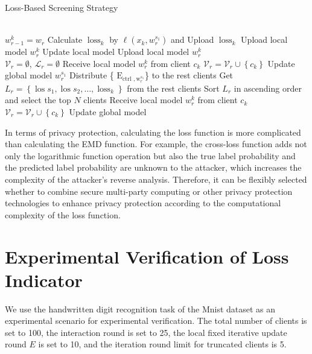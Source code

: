 \documentclass{article}
\begin{document}
\begin{algorithm}[!htbp] 
\caption{Loss-Based Screening Strategy} 
\begin{algorithmic}[1] %
\REQUIRE ~~\\ %
\STATE $w_{r-1}^{k}=w_{r}$
\STATE Calculate $\operatorname{loss}_{k}$ by $\ell\left(x_{k}, w_{r}^{s_{1}}\right)$ and Upload  $\operatorname{loss}_{k}$
\STATE Upload local model $w_{r}^{k}$
\RETURN
\ENDIF
\ENDIF
\ENDIF
\ENDFOR
\STATE Update local model
\STATE Upload local model $w_{r}^{k}$
\ENSURE ~~\\
\STATE $\mathcal{V}_{r}=\emptyset$, $\mathcal{L}_{r}=\emptyset$
\STATE Receive local model $w_{r}^{k}$ from client $c_{k}$
\STATE $\mathcal{V}_{r}=\mathcal{V}_{r} \cup\left\{c_{k}\right\}$
\ENDWHILE
\STATE Update global model $w_{r}^{s_{1}}$
\STATE Distribute \{ $\mathrm{E}_{\text {ctrl }, \mathrm{w}_{r}^{s_{1}}}$\} to the rest clients
\STATE Get $L_{r}=\left\{\operatorname{los} s_{1}, \operatorname{los} s_{2}, \ldots, \operatorname{loss}_{k}\right\}$ from the rest clients
\STATE Sort $L_{r}$ in ascending order and select the top $N$ clients
\STATE Receive local model $w_{r}^{k}$ from client $c_{k}$
\STATE $\mathcal{V}_{r}=\mathcal{V}_{r} \cup\left\{c_{k}\right\}$
\ENDWHILE
\STATE Update global model
\end{algorithmic}
\end{algorithm}

In terms of privacy protection, calculating the loss function is more complicated than calculating the EMD function. For example, the cross-loss function adds not only the logarithmic function operation but also the true label probability and the predicted label probability are unknown to the attacker, which increases the complexity of the attacker's reverse analysis. Therefore, it can be flexibly selected whether to combine secure multi-party computing or other privacy protection technologies to enhance privacy protection according to the computational complexity of the loss function. 

\section{Experimental Verification of Loss Indicator}\label{section1.3}
We use the handwritten digit recognition task of the Mnist dataset as an experimental scenario for experimental verification. The total number of clients is set to 100, the interaction round is set to 25, the local fixed iterative update round $E$ is set to 10, and the iteration round limit for truncated clients is 5. 
\end{document}
